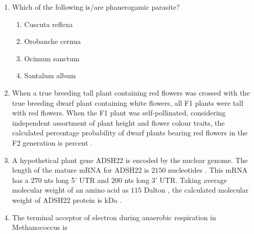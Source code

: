 \documentclass[journal,12pt,onecolumn]{IEEEtran}
\theoremstyle{remark}
\begin{document}
\begin{enumerate}
    \item Which of the following is/are phanerogamic parasite?

    \hfill{}

    \begin{enumerate}
        \item Cuscuta reflexa
        \item Orobanche cernua
        \item Ocimum sanctum
        \item Santalum album
    \end{enumerate}

    \item When a true breeding tall plant containing red flowers was crossed with the true breeding dwarf plant containing white flowers, all F1 plants were tall with red flowers. When the F1 plant was self-pollinated, considering independent assortment of plant height and flower colour traits, the calculated percentage probability of dwarf plants bearing red flowers in the F2 generation is \underline{\hspace{2cm}} percent .

    \hfill{}

    \item A hypothetical plant gene ADSH22 is encoded by the nuclear genome. The length of the mature mRNA for ADSH22 is $2150$ nucleotides . This mRNA has a $270$ nts long 5' UTR and $200$ nts long 3' UTR. Taking average molecular weight of an amino acid as $115$ Dalton , the calculated molecular weight of ADSH22 protein is \underline{\hspace{2cm}} kDa .

    \hfill{}

    \item The terminal acceptor of electron during anaerobic respiration in Methanococcus is

    \hfill{}

    \begin{enumerate}
    \end{enumerate}


\end{enumerate}
\end{document}
